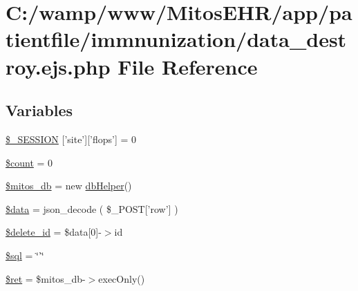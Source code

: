 \hypertarget{patientfile_2immnunization_2data__destroy_8ejs_8php}{\section{\-C\-:/wamp/www/\-Mitos\-E\-H\-R/app/patientfile/immnunization/data\-\_\-destroy.ejs.\-php \-File \-Reference}
\label{patientfile_2immnunization_2data__destroy_8ejs_8php}
}
\subsection*{\-Variables}
\begin{DoxyCompactItemize}
\item 
\hyperlink{patientfile_2immnunization_2data__destroy_8ejs_8php_a99fda8552a3e58235643b79f5af3ded8}{\$\-\_\-\-S\-E\-S\-S\-I\-O\-N} \mbox{[}'site'\mbox{]}\mbox{[}'flops'\mbox{]} = 0
\item 
\hyperlink{patientfile_2immnunization_2data__destroy_8ejs_8php_af789423037bbc89dc7c850e761177570}{\$count} = 0
\item 
\hyperlink{patientfile_2immnunization_2data__destroy_8ejs_8php_ab5d961f93efe4e2e8d8374f01dd6c65a}{\$mitos\-\_\-db} = new \hyperlink{classdb_helper}{db\-Helper}()
\item 
\hyperlink{patientfile_2immnunization_2data__destroy_8ejs_8php_a6efc15b5a2314dd4b5aaa556a375c6d6}{\$data} = json\-\_\-decode ( \$\-\_\-\-P\-O\-S\-T\mbox{[}'row'\mbox{]} )
\item 
\hyperlink{patientfile_2immnunization_2data__destroy_8ejs_8php_a932840e24cb4db95716f8f5c96f22051}{\$delete\-\_\-id} = \$data\mbox{[}0\mbox{]}-\/$>$id
\item 
\hyperlink{patientfile_2immnunization_2data__destroy_8ejs_8php_a047170d6020a882807665812a27e2525}{\$sql} = \char`\"{}'\char`\"{}
\item 
\hyperlink{patientfile_2immnunization_2data__destroy_8ejs_8php_affd9e3eb0aad0a7ca42912cd925f148c}{\$ret} = \$mitos\-\_\-db-\/$>$exec\-Only()
\end{DoxyCompactItemize}



